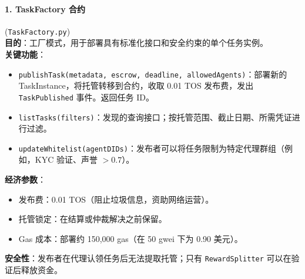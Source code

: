 \documentclass[11pt]{article}
\begin{document}
\paragraph{1. TaskFactory 合约} (\texttt{TaskFactory.py})\\
\textbf{目的}：工厂模式，用于部署具有标准化接口和安全约束的单个任务实例。\\
\textbf{关键功能}：
\begin{itemize}[noitemsep]
  \item \texttt{publishTask(metadata, escrow, deadline, allowedAgents)}：部署新的 TaskInstance，将托管转移到合约，收取 0.01 TOS 发布费，发出 \texttt{TaskPublished} 事件。返回任务 ID。
  \item \texttt{listTasks(filters)}：发现的查询接口；按托管范围、截止日期、所需凭证进行过滤。
  \item \texttt{updateWhitelist(agentDIDs)}：发布者可以将任务限制为特定代理群组（例如，KYC 验证、声誉 $>0.7$）。
\end{itemize}
\textbf{经济参数}：
\begin{itemize}[noitemsep]
  \item 发布费：0.01 TOS（阻止垃圾信息，资助网络运营）。
  \item 托管锁定：在结算或仲裁解决之前保留。
  \item Gas 成本：部署约 150,000 gas（在 50 gwei 下为 0.90 美元）。
\end{itemize}
\textbf{安全性}：发布者在代理认领任务后无法提取托管；只有 \texttt{RewardSplitter} 可以在验证后释放资金。
\end{document}
